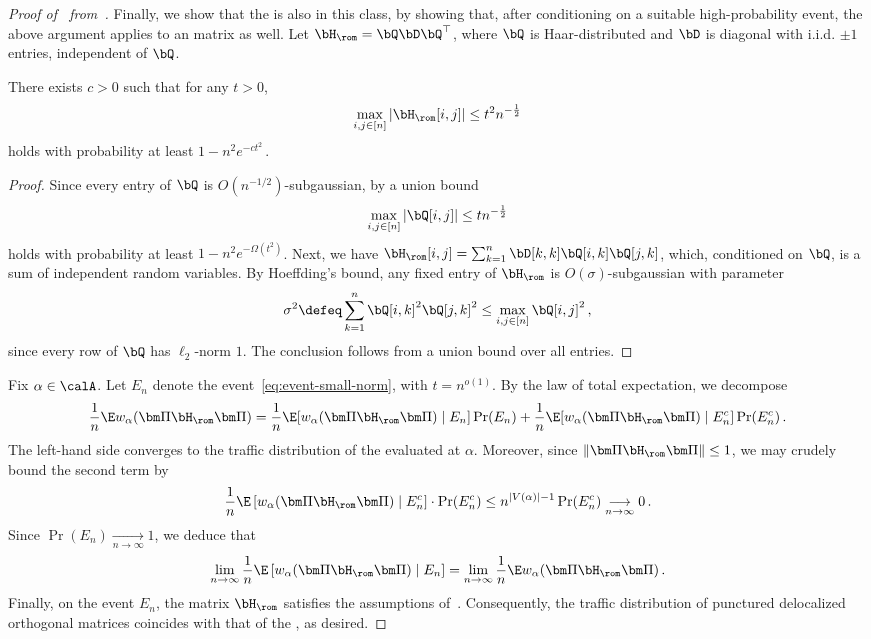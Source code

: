 \begin{proof}[Proof of~ from~]
    Finally, we show that the \rrom is also in this class, by showing that, after conditioning on a suitable high-probability event, the above argument applies to an \rrom matrix as well. 
    Let
    $\bH_{\rom} = \bQ \bD \bQ^\top$, where $\bQ$ is Haar-distributed and $\bD$ is diagonal
    with i.i.d. $\pm 1$ entries, independent of $\bQ$.
    \begin{claim}
        There exists $c>0$ such that for any $t>0$, 
        \begin{align}
            \max_{i,j\in [n]} |\bH_{\textnormal{\rom}}[i,j]|\le t^2 n^{-\frac 12}\label{eq:event-small-norm}
        \end{align}
        holds with probability at least $1-n^2 e^{-ct^2}$\,.
    \end{claim}
    \begin{proof}
    Since
    every entry of $\bQ$ is $O(n^{-1/2})$-subgaussian, by a union bound\[\max_{i,j\in [n]} |\bQ[i,j]|\le t n^{-\frac 12}\] holds with probability at least $1-n^2 e^{-\Omega(t^2)}$. Next, we have $\bH_{\textnormal{\rom}}[i,j] = \sum_{k=1}^n \bD[k,k] \bQ[i,k] \bQ[j,k]$, which, conditioned on $\bQ$, is a sum of independent
    random variables.
    By Hoeffding's bound, any fixed
    entry of $\bH_{\textnormal{\rom}}$ is $O(\sigma)$-subgaussian with parameter
    \[
        \sigma^2 \defeq \sum_{k=1}^n \bQ[i,k]^2 \bQ[j,k]^2\le \max_{i,j\in [n]} \bQ[i,j]^2\,,
    \]
    since every row of $\bQ$ has $\ell_2$-norm $1$. The conclusion follows from a union bound over all entries. 
    \end{proof}

    Fix $\alpha\in\calA$. Let $E_n$ denote the event~\cref{eq:event-small-norm},
    with $t = n^{o(1)}$. By the law of total expectation, we decompose
    \[
        \frac 1n \E w_\alpha(\bm \Pi \bH_{\textnormal{\rom}} \bm \Pi)
        =
        \frac 1n \E\!\left[w_\alpha(\bm \Pi \bH_{\textnormal{\rom}} \bm \Pi)\mid E_n\right]
        \Pr(E_n)
        +
        \frac 1n \E\!\left[w_\alpha(\bm \Pi \bH_{\textnormal{\rom}} \bm \Pi)\mid E_n^c\right]
        \Pr(E_n^c)\,.
    \]
    The left-hand side converges to the traffic distribution of the \rrom
    evaluated at $\alpha$. Moreover, since
    $\|\bm \Pi \bH_{\textnormal{\rom}} \bm \Pi\|\le 1$, we may crudely bound the
    second term by
    \[
        \frac 1n \E \left[w_\alpha(\bm \Pi \bH_{\textnormal{\rom}} \bm \Pi) \mid E_n^c\right]\cdot \Pr(E_n^c)\le n^{|V(\alpha)|-1} \Pr(E_n^c)\underset{n\to\infty}{\longrightarrow } 0\,.
    \]
    Since $\Pr(E_n)\underset{n\to\infty}{\longrightarrow} 1$, we deduce that
    \[
        \lim_{n\to\infty} \frac 1n \E \left[w_\alpha(\bm \Pi \bH_{\textnormal{\rom}} \bm \Pi) \mid E_n\right] = \lim_{n\to\infty} \frac 1n \E w_\alpha(\bm \Pi \bH_{\textnormal{\rom}} \bm \Pi)\,.
    \]
    Finally, on the event $E_n$, the matrix $\bH_{\textnormal{\rom}}$ satisfies the
    assumptions of~. Consequently, the traffic
    distribution of punctured delocalized orthogonal matrices coincides with that
    of the \rrom, as desired.
\end{proof}

